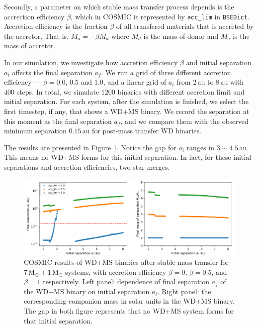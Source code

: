 \documentclass[12pt]{article}
\newcommand{\Msun}{\,\mathrm{M_{\odot}}}
\newcommand{\au}{\, \mathrm{au}}
\begin{document}
Secondly, a parameter on which stable mass transfer process depends is the accrection efficiency $\beta$, which in COSMIC is represented by \verb|acc_lim| in \verb|BSEDict|. Accretion efficiency is the fraction $\beta$ of all transfered materials that is accreted by the accretor. That is, $\dot{M_a} = -\beta\dot{M_d}$ where $M_d$ is the mass of donor and $M_a$ is the mass of accretor.

In our simulation, we investigate how accretion efficiency $\beta$ and initial separation $a_i$ affects the final separation $a_f$. We run a grid of three different accretion efficiency — $\beta = 0.0$, $0.5$ and $1.0$, and a linear grid of $a_i$ from $2 \au$ to $8 \au$ with $400$ steps. In total, we simulate $1200$ binaries with different accretion limit and initial separation. For each system, after the simulation is finished, we select the first timestep, if any, that shows a WD+MS binary. We record the separation at this moment as the final separation $a_f$, and we compare them with the observed minimum separation $0.15 \au$ for post-mass transfer WD binaries.

The results are presented in Figure \ref{stable_hi}. Notice the gap for $a_i$ ranges in $3 \sim 4.5 \au$. This means no WD+MS forms for this initial separation. In fact, for these initial separations and accretion efficiencies, two star merges.

\begin{figure}
  \centering
  \includegraphics[width=0.75\linewidth]{fig/stable_hi_log.png}
  \caption{COSMIC results of WD+MS binaries after stable mass transfer for $7\Msun + 1\Msun$ systems, with accretion efficiency $\beta = 0$, $\beta = 0.5$, and $\beta = 1$ respectively. Left panel: dependence of final separation $a_f$ of the WD+MS binary on initial separation $a_i$. Right panel: the corresponding companion mass in solar units in the WD+MS binary. The gap in both figure represents that no WD+MS system forms for that initial separation.}
  \label{stable_hi}
\end{figure}
\end{document}
